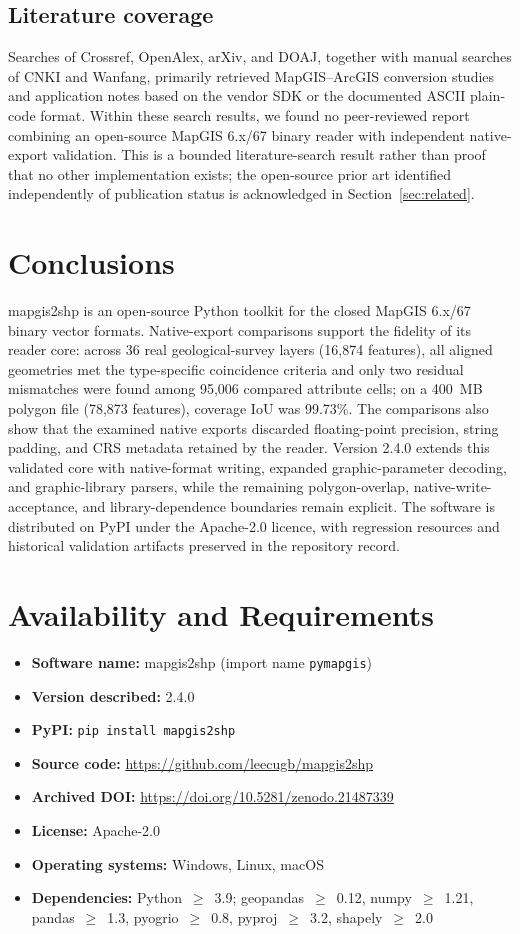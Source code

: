 \documentclass[11pt,a4paper]{article}
\begin{document}
\subsection{Literature coverage}
Searches of Crossref, OpenAlex, arXiv, and DOAJ, together with manual searches of CNKI and Wanfang, primarily retrieved MapGIS--ArcGIS conversion studies and application notes based on the vendor SDK or the documented ASCII plain-code format. Within these search results, we found no peer-reviewed report combining an open-source MapGIS 6.x/67 binary reader with independent native-export validation. This is a bounded literature-search result rather than proof that no other implementation exists; the open-source prior art identified independently of publication status is acknowledged in Section~\ref{sec:related}.

\section{Conclusions}
mapgis2shp is an open-source Python toolkit for the closed MapGIS 6.x/67 binary vector formats. Native-export comparisons support the fidelity of its reader core: across 36 real geological-survey layers (16{,}874 features), all aligned geometries met the type-specific coincidence criteria and only two residual mismatches were found among 95{,}006 compared attribute cells; on a 400~MB polygon file (78{,}873 features), coverage IoU was 99.73\%. The comparisons also show that the examined native exports discarded floating-point precision, string padding, and CRS metadata retained by the reader. Version 2.4.0 extends this validated core with native-format writing, expanded graphic-parameter decoding, and graphic-library parsers, while the remaining polygon-overlap, native-write-acceptance, and library-dependence boundaries remain explicit. The software is distributed on PyPI under the Apache-2.0 licence, with regression resources and historical validation artifacts preserved in the repository record.

\section*{Availability and Requirements}
\begin{itemize}
  \item \textbf{Software name:} mapgis2shp (import name \texttt{pymapgis})
  \item \textbf{Version described:} 2.4.0
  \item \textbf{PyPI:} \texttt{pip install mapgis2shp}
  \item \textbf{Source code:} \url{https://github.com/leecugb/mapgis2shp}
  \item \textbf{Archived DOI:} \url{https://doi.org/10.5281/zenodo.21487339}
  \item \textbf{License:} Apache-2.0
  \item \textbf{Operating systems:} Windows, Linux, macOS
  \item \textbf{Dependencies:} Python~$\geq$~3.9; geopandas~$\geq$~0.12, numpy~$\geq$~1.21, pandas~$\geq$~1.3, pyogrio~$\geq$~0.8, pyproj~$\geq$~3.2, shapely~$\geq$~2.0
\end{itemize}
\end{document}

